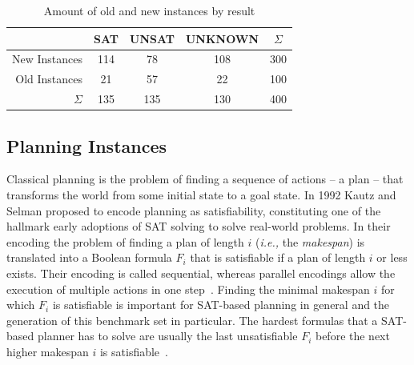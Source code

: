 \documentclass{elsarticle}
\begin{document}
\begin{table}[t]
\centering\small
\begin{tabular}{rcccc}
 & SAT & UNSAT & UNKNOWN & $\Sigma$\\
\hline\arrayrulecolor{lightgray}
New Instances & 114 & 78 & 108 & 300 \\
Old Instances & 21 & 57 & 22 & 100\\
\hline
$\Sigma$ & 135 & 135 & 130 & 400
\end{tabular}
\caption{Amount of old and new instances by result}
\label{tab:final}
\end{table}


\subsection{Planning Instances}
Classical planning is the problem of finding a sequence of actions -- a plan --
that transforms the world from some initial state to a goal state. In 1992 Kautz
and Selman \cite{Kautz1992} proposed to encode planning as satisfiability,
constituting one of the hallmark early adoptions of SAT solving to solve
real-world problems. In their encoding the problem of finding a plan of length
$i$ (\textit{i.e.,} the \emph{makespan}) is translated into a Boolean formula
$F_i$ that is satisfiable if a plan of length $i$ or less exists.
Their encoding is called sequential, whereas parallel encodings allow the execution
of multiple actions in one step~\cite{Rintanen2006, Rintanen2007, Balyo2013}.
Finding the minimal makespan $i$ for which $F_i$ is satisfiable is important for
SAT-based planning in general and the generation of this benchmark set in
particular.
The hardest formulas that a SAT-based planner has to solve are usually
the last unsatisfiable $F_i$ before the next higher makespan $i$ is
satisfiable~\cite{Rintanen2006}.
\end{document}

